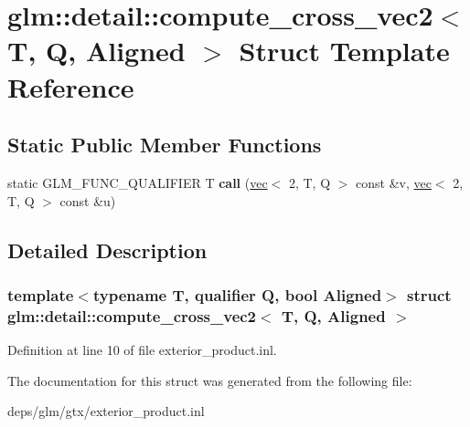 \hypertarget{structglm_1_1detail_1_1compute__cross__vec2}{}\section{glm\+:\+:detail\+:\+:compute\+\_\+cross\+\_\+vec2$<$ T, Q, Aligned $>$ Struct Template Reference}
\label{structglm_1_1detail_1_1compute__cross__vec2}
\subsection*{Static Public Member Functions}
\begin{DoxyCompactItemize}
\item 
\mbox{\label{structglm_1_1detail_1_1compute__cross__vec2_a97f072d3e14a20f16871c54d74a6096a}} 
static G\+L\+M\+\_\+\+F\+U\+N\+C\+\_\+\+Q\+U\+A\+L\+I\+F\+I\+ER T {\bfseries call} (\hyperlink{structglm_1_1vec}{vec}$<$ 2, T, Q $>$ const \&v, \hyperlink{structglm_1_1vec}{vec}$<$ 2, T, Q $>$ const \&u)
\end{DoxyCompactItemize}


\subsection{Detailed Description}
\subsubsection*{template$<$typename T, qualifier Q, bool Aligned$>$\newline
struct glm\+::detail\+::compute\+\_\+cross\+\_\+vec2$<$ T, Q, Aligned $>$}



Definition at line 10 of file exterior\+\_\+product.\+inl.



The documentation for this struct was generated from the following file\+:\begin{DoxyCompactItemize}
\item 
deps/glm/gtx/exterior\+\_\+product.\+inl\end{DoxyCompactItemize}
